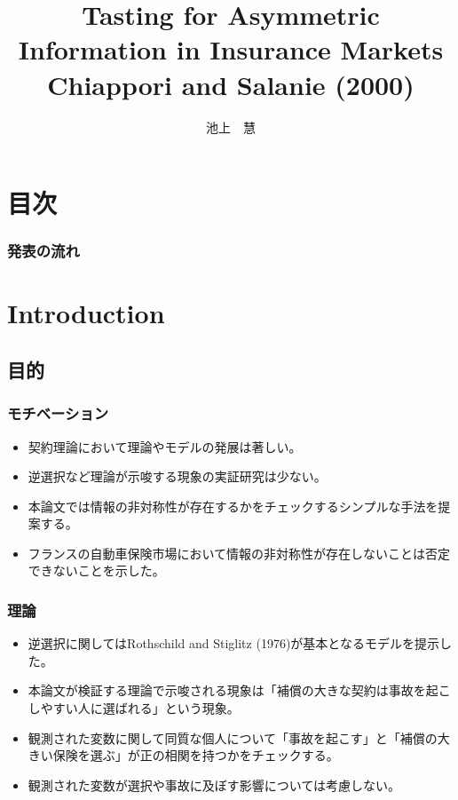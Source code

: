 \documentclass[dvipdfmx, 12pt]{beamer}
\title{Tasting for Asymmetric Information in Insurance Markets \\Chiappori and Salanie (2000)}
\author{池上　慧}
\begin{document}
\newcommand{\argmin}{\mathop{\rm arg~min}\limits}

\frame{\maketitle}

\section*{目次}
\begin{frame} \frametitle{発表の流れ}
\tableofcontents
\end{frame}

\section{Introduction}
\subsection{目的}
\begin{frame}\frametitle{モチベーション}
	\begin{itemize}
	\item 契約理論において理論やモデルの発展は著しい。
	\item 逆選択など理論が示唆する現象の実証研究は少ない。
	\item 本論文では情報の非対称性が存在するかをチェックするシンプルな手法を提案する。
	\item フランスの自動車保険市場において情報の非対称性が存在しないことは否定できないことを示した。
	\end{itemize}
\end{frame}

\begin{frame}\frametitle{理論}
	\begin{itemize}
	\item 逆選択に関してはRothschild and Stiglitz (1976)が基本となるモデルを提示した。
	\item 本論文が検証する理論で示唆される現象は「補償の大きな契約は事故を起こしやすい人に選ばれる」という現象。
	\item 観測された変数に関して同質な個人について「事故を起こす」と「補償の大きい保険を選ぶ」が正の相関を持つかをチェックする。
	\item 観測された変数が選択や事故に及ぼす影響については考慮しない。
	\end{itemize}
\end{frame}
\end{document}
